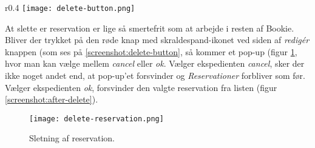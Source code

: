 \begin{wrapfigure}{r}{0.4\textwidth}
  \centering
  \vspace{-12pt}
  \texttt{[image: delete-button.png]}
  \caption{Mulighed for sletning af reservationer}
  \label{screenshot:delete-button}
\end{wrapfigure}

At slette er reservation er lige så smertefrit som at arbejde i resten af Bookie. Bliver der trykket på den røde knap med skraldespand-ikonet ved siden af \textit{redigér} knappen (som ses på \ref{screenshot:delete-button}, så kommer et pop-up (figur \ref{screenshot:delete-reservation}, hvor man kan vælge mellem \textit{cancel} eller \textit{ok}. Vælger ekspedienten \textit{cancel}, sker der ikke noget andet end, at pop-up'et forsvinder og \textit{Reservationer} forbliver som før. Vælger ekspedienten \textit{ok}, forsvinder den valgte reservation fra listen (figur \ref{screenshot:after-delete}).

\begin{figure} [h]
  \centering
  \texttt{[image: delete-reservation.png]}
  \caption{Sletning af reservation.}
  \label{screenshot:delete-reservation}
\end{figure}